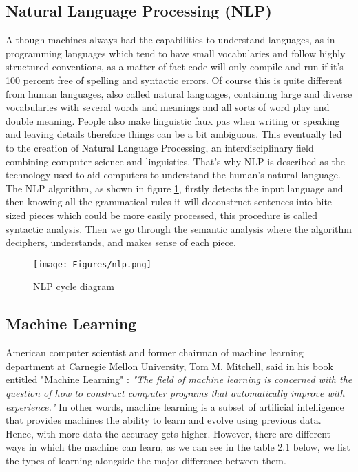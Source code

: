 \subsection{Natural Language Processing (NLP)}
Although machines always had the capabilities to understand languages, as in programming languages which tend to have small vocabularies and follow highly structured conventions, as a matter of fact code will only compile and run if it's 100 percent free of spelling and syntactic errors. Of course this is quite different from human languages, also called natural languages, containing large and diverse vocabularies with several words and meanings and all sorts of word play and double meaning. People also make linguistic faux pas when writing or speaking and leaving details therefore things can be a bit ambiguous. This eventually led to the creation of Natural Language Processing, an interdisciplinary field combining computer science and linguistics. That's why NLP is described as the technology used to aid computers to understand the human's natural language\cite{4}.
The NLP algorithm, as shown in figure \ref{fig:NLP cycle diagram}, firstly detects the input language and then knowing all the grammatical rules it will deconstruct sentences into bite-sized pieces which could be more easily processed, this procedure is called syntactic analysis. Then we go through the semantic analysis where the algorithm deciphers, understands, and makes sense of each piece\cite{5}.
\begin{figure}[H]
\centering
\texttt{[image: Figures/nlp.png]}
\decoRule
\caption{NLP cycle diagram}
\label{fig:NLP cycle diagram}
\end{figure}
\subsection{Machine Learning}
American computer scientist and former chairman of machine learning department at Carnegie Mellon University, Tom M. Mitchell, said in his book entitled "Machine Learning" :\textit{ "The field of machine learning is concerned with the question of how to construct computer programs that automatically improve with experience."}\cite{6}\newline
In other words, machine learning is a subset of artificial intelligence that provides machines the ability to learn and evolve using previous data. Hence, with more data the accuracy gets higher. However, there are different ways in which the machine can learn, as we can see in the table 2.1 below, we list the types of learning alongside the major difference between them.
\newline

